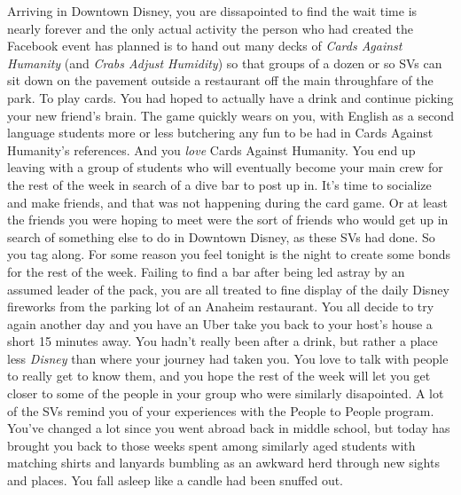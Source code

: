 \documentclass[../main.tex]{subfiles}
\begin{document}
Arriving in Downtown Disney, you are dissapointed to find the wait time is nearly forever and the only actual activity the person who had created the Facebook event has planned is to hand out many decks of \textit{Cards Against Humanity} (and \textit{Crabs Adjust Humidity}) so that groups of a dozen or so SVs can sit down on the pavement outside a restaurant off the main throughfare of the park. To play cards. You had hoped to actually have a drink and continue picking your new friend's brain. The game quickly wears on you, with English as a second language students more or less butchering any fun to be had in Cards Against Humanity's references. And you \textit{love} Cards Against Humanity. You end up leaving with a group of students who will eventually become your main crew for the rest of the week in search of a dive bar to post up in. It's time to socialize and make friends, and that was not happening during the card game. Or at least the friends you were hoping to meet were the sort of friends who would get up in search of something else to do in Downtown Disney, as these SVs had done. So you tag along. For some reason you feel tonight is the night to create some bonds for the rest of the week. Failing to find a bar after being led astray by an assumed leader of the pack, you are all treated to fine display of the daily Disney fireworks from the parking lot of an Anaheim restaurant. You all decide to try again another day and you have an Uber take you back to your host's house a short 15 minutes away. You hadn't really been after a drink, but rather a place less \textit{Disney} than where your journey had taken you. You love to talk with people to really get to know them, and you hope the rest of the week will let you get closer to some of the people in your group who were similarly disapointed. A lot of the SVs remind you of your experiences with the People to People program. You've changed a lot since you went abroad back in middle school, but today has brought you back to those weeks spent among similarly aged students with matching shirts and lanyards bumbling as an awkward herd through new sights and places. You fall asleep like a candle had been snuffed out.
\end{document}
